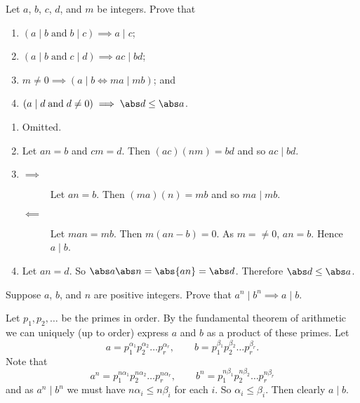 \begin{problem}
	Let $a$, $b$, $c$, $d$, and $m$ be integers.
	Prove that
	\begin{enumerate}
		\item $(a \mid b \;\text{and}\; b \mid c) \implies a \mid c$;
		\item $(a \mid b \;\text{and}\; c \mid d) \implies ac \mid bd$;
		\item $m \neq 0 \implies (a \mid b \iff ma \mid mb)$; and
		\item $(a \mid d \;\text{and}\; d \neq 0) \implies \abs d \leq \abs a$.
	\end{enumerate}
\end{problem}

\begin{solution}
	\begin{enumerate}
		\item Omitted.
		\item 
			Let $an = b$ and $cm = d$.
			Then $(ac)(nm) = bd$ and so $ac \mid bd$.
		\item
			\begin{description}
				\item[$\implies$] 
					Let $an = b$.
					Then $(ma)(n) = mb$ and so $ma \mid mb$.
				\item[$\impliedby$]
					Let $man = mb$.
					Then $m(an - b) = 0$.
					As $m = \neq 0$, $an = b$.
					Hence $a \mid b$.
			\end{description}
		\item
			Let $an = d$.
			So $\abs a \abs n = \abs{an} = \abs d$.
			Therefore $\abs d \leq \abs a$.
	\end{enumerate}
\end{solution}

\begin{problem}
	Suppose $a$, $b$, and $n$ are positive integers.
	Prove that $a^n \mid b^n \implies a \mid b$.
\end{problem}

\begin{solution}
	Let $p_1, p_2, \ldots$ be the primes in order.
	By the fundamental theorem of arithmetic we can uniquely (up to order)
	express $a$ and $b$ as a product of these primes.
	Let
	\[
		a = p_1^{\alpha_1} p_2^{\alpha_2} \ldots p_r^{\alpha_r},
		\qquad b = p_1^{\beta_1} p_2^{\beta_2} \ldots p_r^{\beta_r}.
	\]
	Note that
	\[
		a^n = p_1^{n\alpha_1} p_2^{n\alpha_2} \ldots p_r^{n\alpha_r},
		\qquad b^n = p_1^{n\beta_1} p_2^{n\beta_2} \ldots p_r^{n\beta_r}
	\]
	and as $a^n \mid b^n$ we must have $n\alpha_i \leq n\beta_i$ for each $i$.
	So $\alpha_i \leq \beta_i$.
	Then clearly $a \mid b$.
\end{solution}

